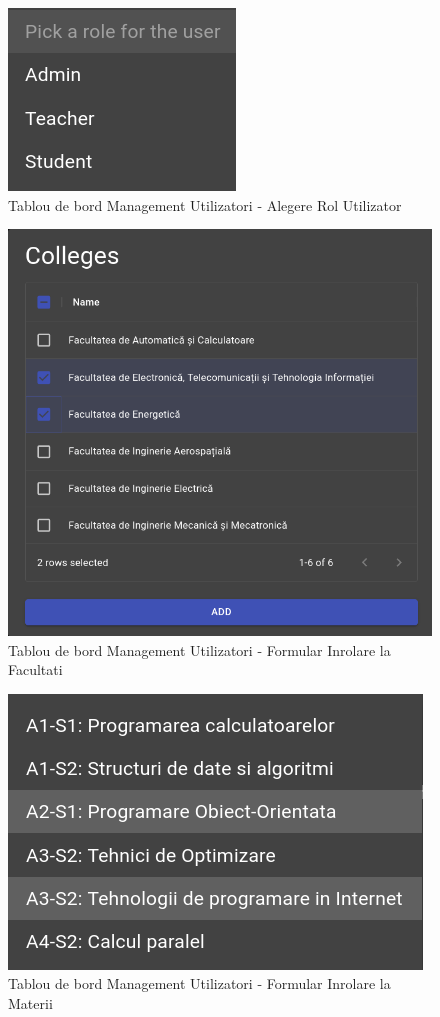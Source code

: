 \documentclass[12pt, a4paper, oneside, romanian]{teza-upb}
\begin{document}
\begin{figure}[H]
\centering
\includegraphics*[width=0.3\columnwidth]{tablou-de-bord-management-utilizatori-alegere-rol-utilizator}
\caption{Tablou de bord Management Utilizatori - Alegere Rol Utilizator}
\label{tablou-de-bord-management-utilizatori-alegere-rol-utilizator}
\end{figure}

\begin{figure}[H]
\centering
\includegraphics*[width=0.75\columnwidth]{tablou-de-bord-management-utilizatori-formular-inrolare-la-facultati}
\caption{Tablou de bord Management Utilizatori - Formular Inrolare la Facultati}
\label{tablou-de-bord-management-utilizatori-formular-inrolare-la-facultati}
\end{figure}

\begin{figure}[H]
\centering
\includegraphics*[width=0.6\columnwidth]{tablou-de-bord-management-utilizatori-formular-inrolare-la-materii}
\caption{Tablou de bord Management Utilizatori - Formular Inrolare la Materii}
\label{tablou-de-bord-management-utilizatori-formular-inrolare-la-materii}
\end{figure}
\end{document}
